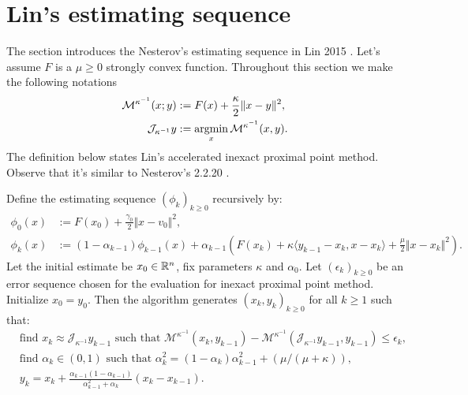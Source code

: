 \documentclass[12pt]{article}
\begin{document}
\section{Lin's estimating sequence}\label{sec:lin-2015}
    The section introduces the Nesterov's estimating sequence in Lin 2015 \cite{lin_universal_2015}.
    Let's assume $F$ is a $\mu \ge 0$ strongly convex function. 
    Throughout this section we make the following notations
    \begin{align*}
        \mathcal M^{\kappa^{-1}}(x; y) &:= F(x) + \frac{\kappa}{2}\Vert x - y\Vert^2, 
        \\
        \mathcal J_{\kappa^{-1}} y &:= \mathop{\rm argmin}\limits_x \mathcal M^{\kappa^{-1}} (x, y). 
    \end{align*}
    The definition below states Lin's accelerated inexact proximal point method. 
    Observe that it's similar to Nesterov's 2.2.20 \cite{nesterov_lectures_2018}. 
    \begin{definition}
        Define the estimating sequence $(\phi_k)_{k \ge0}$ recursively by: 
        \begin{align*}
            \phi_0(x) &:= F(x_0) + \frac{\gamma_0}{2}\Vert x - v_0\Vert^2, 
            \\
            \phi_k(x) &:= 
            (1 - \alpha_{k - 1})\phi_{k - 1}(x)
            + \alpha_{k - 1}\left(
                F(x_k) + \kappa\langle y_{k - 1} - x_k, x - x_k \rangle
                + \frac{\mu}{2}\Vert x - x_k\Vert^2
            \right). 
        \end{align*}
        Let the initial estimate be $x_0 \in \mathbb R^n$, fix parameters $\kappa$ and $\alpha_0$. 
        Let $(\epsilon_k)_{k \ge 0}$ be an error sequence chosen for the evaluation for inexact proximal point method. 
        Initialize $x_0 = y_0$. Then the algorithm generates $(x_k, y_k)_{k\ge 0}$ for all $k \ge 1$ such that: 
        \begin{align*}
            & \text{find } x_k \approx \mathcal J_{\kappa^{-1}} y_{k - 1} \text{ such that } \mathcal M^{\kappa^{-1}}(x_k, y_{k - 1}) - \mathcal M^{\kappa^{-1}}(\mathcal J_{\kappa^{-1}}y_{k - 1}, y_{k - 1}) \le \epsilon_k,
            \\
            & \text{find } \alpha_k \in (0, 1) \text{ such that } \alpha_k^2 = (1 - \alpha_k)\alpha_{k - 1}^2 + (\mu/(\mu + \kappa)),
            \\
            & 
            y_{k} = x_k + \frac{\alpha_{k - 1}(1 - \alpha_{k - 1})}{\alpha_{k - 1}^2 + \alpha_k}(x_k - x_{k - 1}). 
        \end{align*}
    \end{definition}
\end{document}
